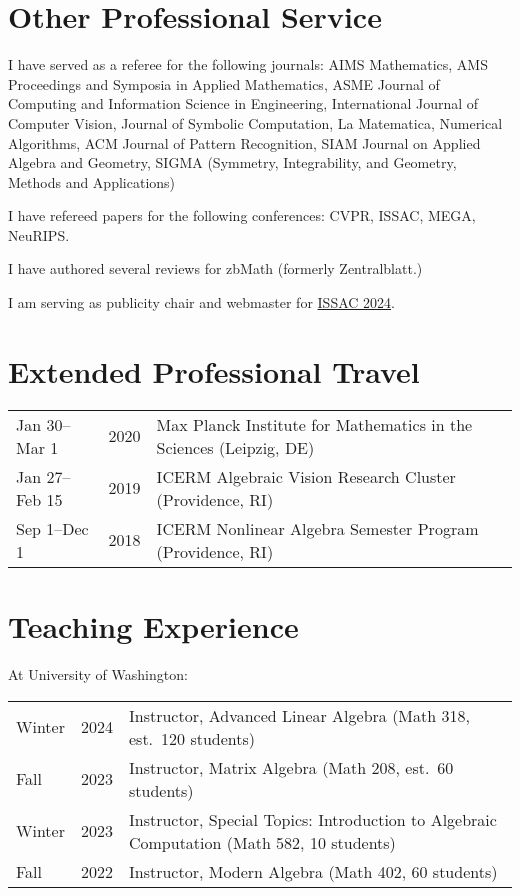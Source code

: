 \documentclass[margin,line,pifont,palatino,courier]{res}
\begin{document}
\begin{resume}
\section{\sc Other Professional Service}

I have served as a referee for the following journals: AIMS Mathematics, AMS Proceedings and Symposia in Applied Mathematics, ASME Journal of Computing and Information Science in Engineering, International Journal of Computer Vision, Journal of Symbolic Computation, La Matematica, Numerical Algorithms, ACM Journal of Pattern Recognition, SIAM Journal on Applied Algebra and Geometry, SIGMA (Symmetry, Integrability, and Geometry, Methods and Applications)

I have refereed papers for the following conferences: CVPR, ISSAC, MEGA, NeuRIPS.

I have authored several reviews for zbMath (formerly Zentralblatt.)

I am serving as publicity chair and webmaster for \hyperlink{https://www.issac-conference.org/2024/}{ISSAC 2024}.

\section{\sc Extended Professional Travel}

\begin{tabular}{@{}p{0.9in}p{0.2in}p{4.2in}}
  Jan 30--Mar 1 & 2020 & Max Planck Institute for Mathematics in the Sciences (Leipzig, DE)\\
  Jan 27--Feb 15 & 2019 & ICERM Algebraic Vision Research Cluster (Providence, RI)\\
  Sep 1--Dec 1 & 2018 & ICERM Nonlinear Algebra Semester Program (Providence, RI)
\end{tabular}

\pagebreak

\section{\sc Teaching Experience}

At University of Washington:

\begin{tabular}{@{}p{0.4in}p{0.3in}p{4in}}
  Winter & 2024 & Instructor, Advanced Linear Algebra (Math 318, est.~120 students)\\
  Fall   & 2023 & Instructor, Matrix Algebra (Math 208, est.~60 students)\\
  Winter & 2023 & Instructor, Special Topics: Introduction to Algebraic Computation (Math 582, 10 students)\\
  Fall   & 2022 & Instructor, Modern Algebra (Math 402, 60 students)
\end{tabular}


\end{resume}
\end{document}
